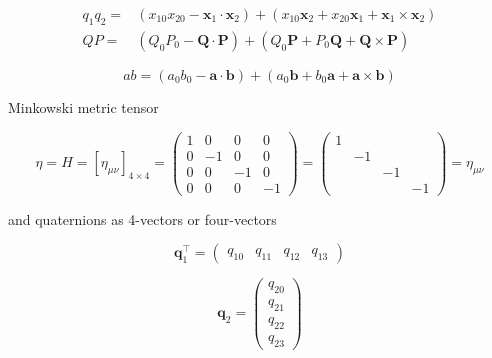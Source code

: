 \documentclass[
]{book}
\theoremstyle{definition}
\theoremstyle{definition}
\theoremstyle{definition}
\theoremstyle{definition}
\theoremstyle{remark}
\begin{document}
\[
\begin{aligned}
q_{{\scriptscriptstyle 1}}q_{{\scriptscriptstyle 2}}= & \left(x_{{\scriptscriptstyle 10}}x_{{\scriptscriptstyle 20}}-\boldsymbol{x}_{{\scriptscriptstyle 1}}\cdot\boldsymbol{x}_{{\scriptscriptstyle 2}}\right)+\left(x_{{\scriptscriptstyle 10}}\boldsymbol{x}_{{\scriptscriptstyle 2}}+x_{{\scriptscriptstyle 20}}\boldsymbol{x}_{{\scriptscriptstyle 1}}+\boldsymbol{x}_{{\scriptscriptstyle 1}}\times\boldsymbol{x}_{{\scriptscriptstyle 2}}\right)\\
QP= & \left(Q_{{\scriptscriptstyle 0}}P_{{\scriptscriptstyle 0}}-\boldsymbol{Q}\cdot\boldsymbol{P}\right)+\left(Q_{{\scriptscriptstyle 0}}\boldsymbol{P}+P_{{\scriptscriptstyle 0}}\boldsymbol{Q}+\boldsymbol{Q}\times\boldsymbol{P}\right)
\end{aligned}
\]

\[
ab=\left(a_{{\scriptscriptstyle 0}}b_{{\scriptscriptstyle 0}}-\boldsymbol{a}\cdot\boldsymbol{b}\right)+\left(a_{{\scriptscriptstyle 0}}\boldsymbol{b}+b_{{\scriptscriptstyle 0}}\boldsymbol{a}+\boldsymbol{a}\times\boldsymbol{b}\right)
\]

Minkowski metric tensor

\[
\eta=H=\left[\eta_{{\scriptscriptstyle \mu\nu}}\right]_{4\times4}=\begin{pmatrix}1 & 0 & 0 & 0\\
0 & -1 & 0 & 0\\
0 & 0 & -1 & 0\\
0 & 0 & 0 & -1
\end{pmatrix}=\begin{pmatrix}1\\
 & -1\\
 &  & -1\\
 &  &  & -1
\end{pmatrix}=\eta_{{\scriptscriptstyle \mu\nu}}
\]

and quaternions as 4-vectors or four-vectors

\[
\boldsymbol{q}_{{\scriptscriptstyle 1}}^{\intercal}=\begin{pmatrix}q_{{\scriptscriptstyle 10}} & q_{{\scriptscriptstyle 11}} & q_{{\scriptscriptstyle 12}} & q_{{\scriptscriptstyle 13}}\end{pmatrix}
\]

\[
\boldsymbol{q}_{{\scriptscriptstyle 2}}=\begin{pmatrix}q_{{\scriptscriptstyle 20}}\\
q_{{\scriptscriptstyle 21}}\\
q_{{\scriptscriptstyle 22}}\\
q_{{\scriptscriptstyle 23}}
\end{pmatrix}
\]
\end{document}
